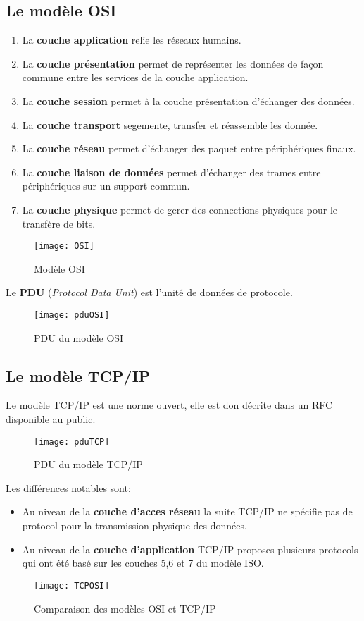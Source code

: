  \subsection{Le modèle OSI}

 \begin{enumerate}
 \item La \textbf{couche application} relie les réseaux humains.
 \item La \textbf{couche présentation} permet de représenter les données de façon commune entre les services de la couche application.
 \item La \textbf{couche session} permet à la couche présentation d'échanger des données.
 \item La \textbf{couche transport} segemente, transfer et réassemble les donnée.
 \item La \textbf{couche réseau} permet d'échanger des paquet entre périphériques finaux.
 \item La \textbf{couche liaison de données} permet d'échanger des trames entre périphériques sur un support commun.
 \item La \textbf{couche physique} permet de gerer des connections physiques pour le transfère de bits.
 \end{enumerate}

 \begin{figure}[h]
	 \centering
	 \texttt{[image: OSI]}
	 \caption{Modèle OSI}
 \end{figure}

 Le \textbf{PDU} (\textit{Protocol Data Unit}) est l'unité de données de protocole.

 \begin{figure}[h]
	 \centering
	 \texttt{[image: pduOSI]}
	 \caption{PDU du modèle OSI}
 \end{figure}

 \subsection{Le modèle TCP/IP}

 Le modèle TCP/IP est une norme ouvert, elle est don décrite dans un RFC disponible au public.

 \begin{figure}[h]
	 \centering
	 \texttt{[image: pduTCP]}
	 \caption{PDU du modèle TCP/IP}
 \end{figure}

 Les différences notables sont:
 \begin{itemize}
	 \item Au niveau de la \textbf{couche d'acces réseau} la suite TCP/IP ne spécifie pas de protocol pour la transmission physique des données.
	 \item Au niveau de la \textbf{couche d'application} TCP/IP proposes plusieurs protocols qui ont été basé sur les couches 5,6 et 7 du modèle ISO\@.
 \end{itemize}
 \begin{figure}[h]
	 \centering
	 \texttt{[image: TCPOSI]}
	 \caption{Comparaison des modèles OSI et TCP/IP}
 \end{figure}



